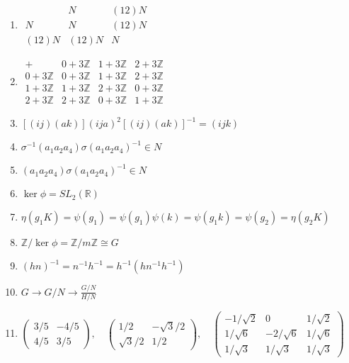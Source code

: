 \documentclass[oneside,10pt,]{article}
\begin{document}
\begin{enumerate}
\item{}\(\displaystyle \begin{array}{c|cc} & N & (12) N \\ \hline N & N & (12) N \\ (12) N & (12) N & N \end{array}\)%
\item{}\(\displaystyle \begin{array}{c|ccc} + & 0 + 3{\mathbb Z} & 1 + 3{\mathbb Z} & 2 + 3{\mathbb Z} \\\hline 0 + 3{\mathbb Z} & 0 + 3{\mathbb Z} & 1 + 3{\mathbb Z} & 2 + 3{\mathbb Z} \\ 1 + 3{\mathbb Z} & 1 + 3{\mathbb Z} & 2 + 3{\mathbb Z} & 0 + 3{\mathbb Z} \\ 2 + 3{\mathbb Z} & 2 + 3{\mathbb Z} & 0 + 3{\mathbb Z} & 1 + 3{\mathbb Z} \end{array}\)%
\item{}\(\displaystyle [(i j)(a k)](i j a)^2 [(i j)(a k)]^{-1} = (i j k)\)%
\item{}\(\displaystyle \sigma^{-1}(a_1 a_2 a_4)\sigma(a_1 a_2 a_4)^{-1} \in N\)%
\item{}\(\displaystyle (a_1 a_2 a_4)\sigma(a_1 a_2 a_4)^{-1} \in N\)%
\item{}\(\displaystyle \ker \phi = SL_2( {\mathbb R })\)%
\item{}\(\displaystyle \eta(g_1 K) = \psi(g_1) = \psi(g_1) \psi(k) = \psi(g_1k) = \psi(g_2) = \eta(g_2 K)\)%
\item{}\(\displaystyle {\mathbb Z} / \ker \phi = {\mathbb Z} / m {\mathbb Z} \cong G\)%
\item{}\(\displaystyle ( hn )^{-1} = n^{-1 } h^{-1} = h^{-1} (h n^{-1} h^{-1} )\)%
\item{}\(\displaystyle G \rightarrow G/N \rightarrow \frac{G/N}{H/N} \)%
\item{}\(\displaystyle \begin{pmatrix} 3/5 & -4/5 \\ 4/5 & 3/5 \end{pmatrix}, \quad \begin{pmatrix} 1/2 & -\sqrt{3}/2 \\ \sqrt{3}/2 & 1/2 \end{pmatrix}, \quad \begin{pmatrix} -1/\sqrt{2} & 0 & 1/ \sqrt{2} \\ 1/\sqrt{6} & -2/\sqrt{6} & 1/\sqrt{6} \\ 1/ \sqrt{3} & 1/ \sqrt{3} & 1/ \sqrt{3} \end{pmatrix}\)%

\end{enumerate}
\end{document}
